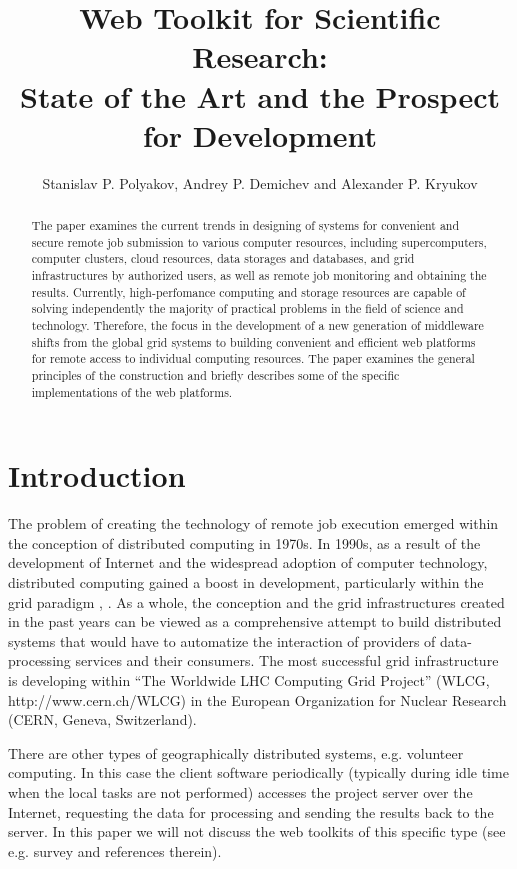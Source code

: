 \documentclass[procedia]{easychair}
\title{Web Toolkit for Scientific Research: \\State of the Art and the Prospect for Development}
\author{Stanislav P. Polyakov, Andrey P. Demichev and Alexander P. Kryukov\\
}
\institute{
  Skobeltsyn Institute of Nuclear Physics, Lomonosov Moscow State University, \\
  Leninskie gory, 1, Moscow, 119991, Russia\\
  \email{s.p.polyakov@gmail.com}, \email{demichev@theory.sinp.msu.ru}, \email{kryukov@theory.sinp.msu.ru}\\
 }
\begin{document}
\maketitle


\begin{abstract}
  The paper examines the current trends in designing of systems for convenient and secure remote job submission to various computer resources, including supercomputers, computer clusters, cloud resources, data storages and databases, and grid infrastructures by authorized users, as well as remote job monitoring and obtaining the results. Currently, high-perfomance computing and storage resources are capable of solving independently the majority of practical problems in the field of science and technology. Therefore, the focus in the development of a new generation of middleware shifts from the global grid systems to building convenient and efficient web platforms for remote access to individual computing resources. The paper examines the general principles of the construction and briefly describes some of the specific implementations of the web platforms.
\end{abstract}




\section{Introduction}
\label{sect:introduction}

The problem of creating the technology of remote job execution emerged within the conception of distributed computing \cite{1} in 1970s. In 1990s, as a result of the development of Internet and the widespread adoption of computer technology, distributed computing gained a boost in development, particularly within the grid paradigm \cite{2}, \cite{2a}. As a whole, the conception and the grid infrastructures created in the past years can be viewed as a comprehensive attempt to build distributed systems that would have to automatize the interaction of providers of data-processing services and their consumers. The most successful grid infrastructure is developing within ``The Worldwide LHC Computing Grid Project'' (WLCG, http://www.cern.ch/WLCG) in the European Organization for Nuclear Research (CERN, Geneva, Switzerland).

There are other types of geographically distributed systems, e.g. volunteer computing. In this case the client software periodically (typically during idle time when the local tasks are not performed) accesses the project server over the Internet, requesting the data for processing and sending the results back to the server. In this paper we will not discuss the web toolkits of this specific type (see e.g. survey \cite{3} and references therein).
\end{document}
